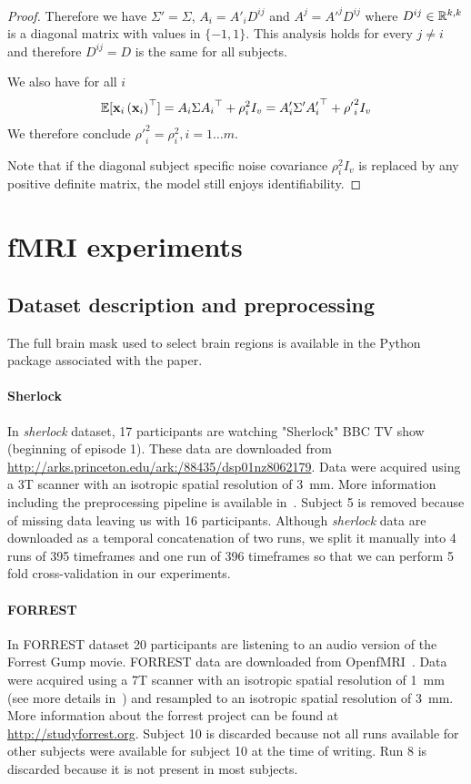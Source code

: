 \documentclass{report}
\begin{document}
{\begin{proof}
Therefore we have $\Sigma' = \Sigma$, $A_i = A'_i D^{ij}$ and $A^j = A'^j D^{ij}$ where $D^{ij} \in \mathbb{R}^{k, k}$ is a diagonal matrix with values in $\{-1, 1\}$. This analysis holds for every $j \neq i$ and therefore $D^{ij} = D$ is the same for all subjects.

We also have for all $i$
\begin{align*}
    \mathbb{E}[\mathbf{x}_i \left(\mathbf{x}_i\right)^{\top}] = A_i \Sigma {A_i}^{\top} + \rho_i^2 I_v =  A'_i \Sigma' {A'_i}^{\top}  + {\rho'}_i^2 I_v\\
\end{align*}
We therefore conclude ${\rho'}_i^2 = \rho_i^2, i=1 \dots m$.

Note that if the diagonal subject specific noise covariance $\rho_i^2 I_v$ is replaced by any positive definite matrix, the model still enjoys identifiability.
\end{proof}

\section{fMRI experiments}
\label{sec:app_expts}
\subsection{Dataset description and preprocessing}
\label{preprocessing}
The full brain mask used to select brain regions is available in the Python package associated with the paper.

\paragraph{Sherlock}
In \emph{sherlock} dataset, 17 participants are watching "Sherlock" BBC TV show (beginning of episode 1). 
%
These data are downloaded from \url{http://arks.princeton.edu/ark:/88435/dsp01nz8062179}. 
%
Data were acquired using a 3T scanner with an isotropic spatial resolution of 3 mm. 
%
More information including the preprocessing pipeline is available in~\cite{chen2017shared}.
%
Subject 5 is removed because of missing data leaving us with 16 participants.
%
Although \emph{sherlock} data are downloaded as a temporal concatenation of two runs, we split it manually into 4 runs of 395 timeframes and one run of 396 timeframes so that we can perform 5 fold cross-validation in our experiments.


\paragraph{FORREST}
In FORREST dataset 20 participants are listening to an audio version of the Forrest Gump  movie.
%
FORREST data are downloaded from OpenfMRI~\cite{poldrack2013toward}. 
%
Data were acquired using a 7T scanner with an isotropic spatial resolution of 1~mm (see more details in~\cite{hanke2014high}) and resampled to an isotropic spatial resolution of 3~mm.
%
More information about the forrest project can be found at \url{http://studyforrest.org}.
%
Subject 10 is discarded because not all runs available for other subjects were available for subject 10 at the time of writing.
%
Run 8 is discarded because it is not present in most subjects.
 
}
\end{document}
